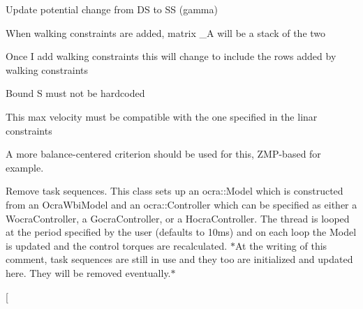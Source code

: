 \begin{DoxyRefList}
\-Update potential change from \-D\-S to \-S\-S (gamma)  
\item[\label{todo__todo000005}%
\hypertarget{todo__todo000005}{}%
\-Member \hyperlink{classMIQPLinearConstraints_a2f41d99a16293718b94d17ce9ee5b59d}{\-M\-I\-Q\-P\-Linear\-Constraints\-:\-:build\-Shape\-And\-Admissibility\-In\-Preview\-Window} ()]\-When walking constraints are added, matrix \-\_\-\-A will be a stack of the two  
\item[\label{todo__todo000004}%
\hypertarget{todo__todo000004}{}%
\-Member \hyperlink{classMIQPLinearConstraints_a882b9a928fc7a89a4aa948b33bed72d1}{\-M\-I\-Q\-P\-Linear\-Constraints\-:\-:\-M\-I\-Q\-P\-Linear\-Constraints} (unsigned int dt, unsigned int \-N, bool add\-Shape\-Ctrs=true, bool add\-Admissibility\-Ctrs=true, bool add\-Walking\-Ctrs=false)]\-Once \-I add walking constraints this will change to include the rows added by walking constraints  
\item[\label{todo__todo000006}%
\hypertarget{todo__todo000006}{}%
\-Member \hyperlink{classSingleSupport_a78e5b7c89b828d718560cec73c0f6218}{\-Single\-Support\-:\-:build\-Matrix\-Ci} ()]\-Bound \-S must not be hardcoded  
\item[\label{todo__todo000010}%
\hypertarget{todo__todo000010}{}%
\-Member \hyperlink{classStepController_a8f061f201c651d920ca02f7daa07adfe}{\-Step\-Controller\-:\-:initialize} ()]\-This max velocity must be compatible with the one specified in the linar constraints  
\item[\label{todo__todo000002}%
\hypertarget{todo__todo000002}{}%
\-Member \hyperlink{classSteppingDemoClient_ad8fbc186267a47a73bb77e78199f2b8c}{\-Stepping\-Demo\-Client\-:\-:is\-Balanced} ()]\-A more balance-\/centered criterion should be used for this, \-Z\-M\-P-\/based for example.  
\item[\label{todo__todo000001}%
\hypertarget{todo__todo000001}{}%
\-Class \hyperlink{classThread}{\-Thread} ]\-Remove task sequences. \-This class sets up an ocra\-::\-Model which is constructed from an \-Ocra\-Wbi\-Model and an ocra\-::\-Controller which can be specified as either a \-Wocra\-Controller, a \-Gocra\-Controller, or a \-Hocra\-Controller. \-The thread is looped at the period specified by the user (defaults to 10ms) and on each loop the \-Model is updated and the control torques are recalculated. $\ast$\-At the writing of this comment, task sequences are still in use and they too are initialized and updated here. \-They will be removed eventually.$\ast$  
\item[\label{todo__todo000012}%

\end{DoxyRefList}
